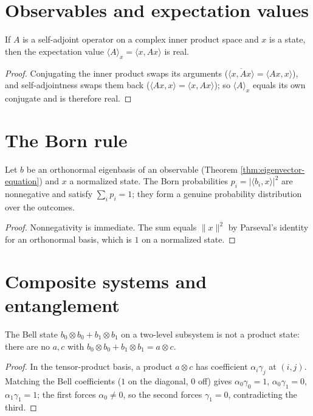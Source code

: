 \section{Observables and expectation values}

\begin{theorem}
  \label{thm:expectation-real}
  \leanok
  If $A$ is a self-adjoint operator on a complex inner product space and $x$ is a
  state, then the expectation value $\langle A\rangle_x = \langle x, A x\rangle$ is
  real.
\end{theorem}
\begin{proof}\leanok
  Conjugating the inner product swaps its arguments ($\overline{\langle x, Ax\rangle}
  = \langle Ax, x\rangle$), and self-adjointness swaps them back
  ($\langle Ax, x\rangle = \langle x, Ax\rangle$); so $\langle A\rangle_x$ equals
  its own conjugate and is therefore real.
\end{proof}

\section{The Born rule}

\begin{theorem}
  \label{thm:born-rule}
  \leanok
  Let $b$ be an orthonormal eigenbasis of an observable (Theorem
  \ref{thm:eigenvector-equation}) and $x$ a normalized state. The Born
  probabilities $p_i = |\langle b_i, x\rangle|^2$ are nonnegative and satisfy
  $\sum_i p_i = 1$; they form a genuine probability distribution over the
  outcomes.
\end{theorem}
\begin{proof}\leanok
  Nonnegativity is immediate. The sum equals $\|x\|^2$ by Parseval's identity for
  an orthonormal basis, which is $1$ on a normalized state.
\end{proof}

\section{Composite systems and entanglement}

\begin{theorem}
  \label{thm:bell-entangled}
  \leanok
  The Bell state $b_0\otimes b_0 + b_1\otimes b_1$ on a two-level subsystem is not
  a product state: there are no $a, c$ with $b_0\otimes b_0 + b_1\otimes b_1 =
  a\otimes c$.
\end{theorem}
\begin{proof}\leanok
  In the tensor-product basis, a product $a\otimes c$ has coefficient
  $\alpha_i\gamma_j$ at $(i,j)$. Matching the Bell coefficients ($1$ on the
  diagonal, $0$ off) gives $\alpha_0\gamma_0 = 1$, $\alpha_0\gamma_1 = 0$,
  $\alpha_1\gamma_1 = 1$; the first forces $\alpha_0\ne 0$, so the second forces
  $\gamma_1 = 0$, contradicting the third.
\end{proof}

